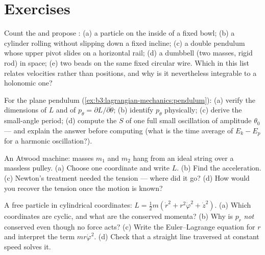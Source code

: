 \section{Exercises}

\begin{exercise}[$\star$]\label{exo:b3:lagrangian-mechanics:1}
Count the  and propose : (a) a
particle on the inside of a fixed bowl; (b) a cylinder rolling without
slipping down a fixed incline; (c) a double pendulum whose upper pivot
slides on a horizontal rail; (d) a dumbbell (two masses, rigid rod) in
space; (e) two beads on the same fixed circular wire. Which 
in this list relates velocities rather than positions, and why is it
nevertheless integrable to a holonomic one?
\end{exercise}

\begin{exercise}[$\star$]\label{exo:b3:lagrangian-mechanics:2}
For the plane pendulum (\cref{ex:b3:lagrangian-mechanics:pendulum}):
(a) verify the dimensions of $L$ and of $p_\theta =
\partial L/\partial\dot\theta$; (b) identify $p_\theta$ physically; (c)
derive the small-angle period; (d) compute the  $S$ of one full
small oscillation of amplitude $\theta_0$ --- and explain the answer
before computing (what is the time average of $E_k - E_p$ for a
harmonic oscillation?).
\end{exercise}

\begin{exercise}[$\star$]\label{exo:b3:lagrangian-mechanics:3}
An Atwood machine: masses $m_1$ and $m_2$ hang from an ideal string
over a massless pulley. (a) Choose one coordinate and write $L$. (b)
Find the acceleration. (c) Newton's treatment needed the tension ---
where did it go? (d) How would you recover the tension once the motion
is known?
\end{exercise}

\begin{exercise}[$\star$]\label{exo:b3:lagrangian-mechanics:4}
A free particle in cylindrical coordinates: $L = \tfrac12 m(\dot r^2 +
r^2\dot\varphi^2 + \dot z^2)$. (a) Which coordinates are cyclic, and
what are the conserved momenta? (b) Why is $p_r$ \emph{not} conserved
even though no force acts? (c) Write the Euler--Lagrange equation for
$r$ and interpret the term $mr\dot\varphi^2$. (d) Check that a
straight line traversed at constant speed solves it.
\end{exercise}


